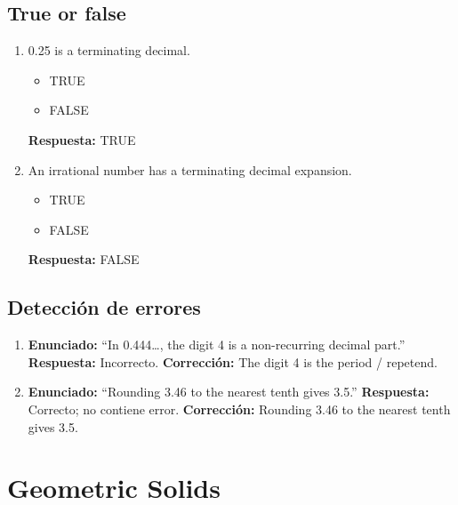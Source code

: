 \documentclass[11pt,a4paper]{article}
\begin{document}
\subsection{True or false}
\begin{enumerate}
\item 0.25 is a terminating decimal.
\begin{itemize}
\item TRUE
\item FALSE
\end{itemize}
\textbf{Respuesta:} TRUE
\item An irrational number has a terminating decimal expansion.
\begin{itemize}
\item TRUE
\item FALSE
\end{itemize}
\textbf{Respuesta:} FALSE
\end{enumerate}
\subsection{Detecci\'on de errores}
\begin{enumerate}
\item \textbf{Enunciado:} \textquotedblleft In 0.444\ldots , the digit 4 is a non-recurring decimal part.\textquotedblright
\textbf{Respuesta:} Incorrecto.
\textbf{Correcci\'on:} The digit 4 is the period / repetend.
\item \textbf{Enunciado:} \textquotedblleft Rounding 3.46 to the nearest tenth gives 3.5.\textquotedblright
\textbf{Respuesta:} Correcto; no contiene error.
\textbf{Correcci\'on:} Rounding 3.46 to the nearest tenth gives 3.5.
\end{enumerate}
\section{Geometric Solids}
\end{document}
